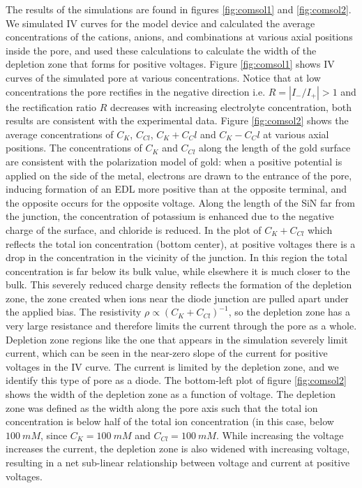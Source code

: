 		The results of the simulations are found in figures \ref{fig:comsol1} and \ref{fig:comsol2}. We simulated IV curves for the model device and calculated the average concentrations of the cations, anions, and combinations at various axial positions inside the pore, and used these calculations to calculate the width of the depletion zone that forms for positive voltages. Figure \ref{fig:comsol1} shows IV curves of the simulated pore at various concentrations. Notice that at low concentrations the pore rectifies in the negative direction i.e. $R=|I_{-}/I_{+}|>1$ and the rectification ratio $R$ decreases with increasing electrolyte concentration, both results are consistent with the experimental data. Figure \ref{fig:comsol2} shows the average concentrations of $C_{K}$, $C_{Cl}$, $C_K+C_Cl$ and $C_K-C_Cl$ at various axial positions. The concentrations of $C_{K}$ and $C_{Cl}$ along the length of the gold surface are consistent with the polarization model of gold: when a positive potential is applied on the side of the metal, electrons are drawn to the entrance of the pore, inducing formation of an EDL more positive than at the opposite terminal, and the opposite occurs for the opposite voltage. Along the length of the SiN far from the junction, the concentration of potassium is enhanced due to the negative charge of the surface, and chloride is reduced. In the plot of $C_{K}+C_{Cl}$ which reflects the total ion concentration (bottom center), at positive voltages there is a drop in the concentration in the vicinity of the junction. In this region the total concentration is far below its bulk value, while elsewhere it is much closer to the bulk. This severely reduced charge density reflects the formation of the depletion zone, the zone created when ions near the diode junction are pulled apart under the applied bias. The resistivity $\rho\propto \left(C_{K}+C_{Cl}\right)^{-1}$, so the depletion zone has a very large resistance and therefore limits the current through the pore as a whole. Depletion zone regions like the one that appears in the simulation severely limit current, which can be seen in the near-zero slope of the current for positive voltages in the IV curve. The current is limited by the depletion zone, and we identify this type of pore as a diode. The bottom-left plot of figure \ref{fig:comsol2} shows the width of the depletion zone as a function of voltage. The depletion zone was defined as the width along the pore axis such that the total ion concentration is below half of the total ion concentration (in this case, below $\SI{100}{mM}$, since $C_{K}=\SI{100}{mM}$ and $C_{Cl}=\SI{100}{mM}$. While increasing the voltage increases the current, the depletion zone is also widened with increasing voltage, resulting in a net sub-linear relationship between voltage and current at positive voltages.
		
